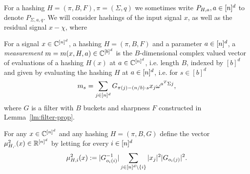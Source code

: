 For a hashing $H=(\pi, B, F), \pi=(\Sigma, q)$ we sometimes write $P_{H, a}, a\in {[n]^d}$ to denote $P_{\Sigma, a, q}$. We will consider hashings of the input signal $x$, as well as the residual signal $x-\chi$, where 

\begin{definition}[Measurement $m=m(x, H, a)$]
For a signal $x\in \mathbb{C}^{{[n]^d}}$, a hashing $H=(\pi, B, F)$ and a parameter $a\in {[n]^d}$, a {\em measurement} $m=m(x, H, a)\in \mathbb{C}^{[b]^d}$ is the $B$-dimensional complex valued vector of evaluations of a hashing $H(x)$ at $a\in \mathbb{C}^{{[n]^d}}$, i.e. 
length $B$, indexed by $[b]^d$ and given by evaluating the hashing $H$ at $a\in {[n]^d}$, i.e. for $s\in [b]^d$
$$
m_s  = \sum_{j\in {[n]^d}} G_{\pi(j)-(n/b)\cdot s}x_j \omega^{a^T \Sigma j},
$$
where $G$ is a filter with $B$ buckets and sharpness $F$ constructed in Lemma~\ref{lm:filter-prop}.
\end{definition}

\begin{definition}
For any $x\in \mathbb{C}^{[n]^d}$ and any hashing $H=(\pi, B, G)$ define the vector $\mu^2_{H, \cdot}(x)\in \mathbb{R}^{[n]^d}$ by letting for every $i\in {[n]^d}$ 
$$\mu^2_{H, i}(x):=|G_{o_i(i)}^{-1}|\sum_{j \in {[n]^d}\setminus \{i\}} |x_j|^2 |G_{o_i(j)}|^2.$$
\end{definition}

